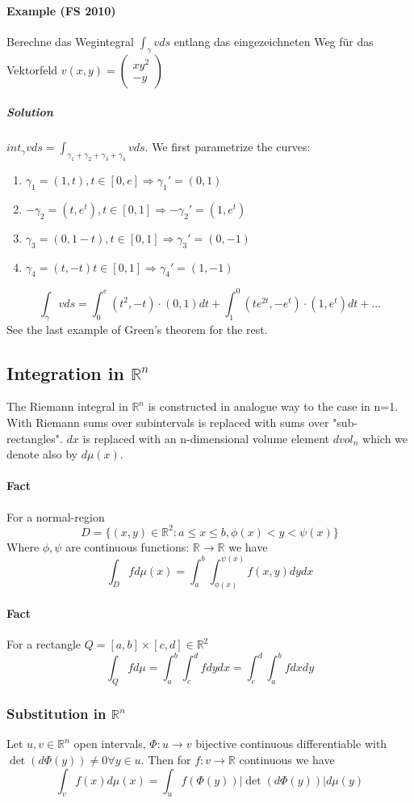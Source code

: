 \documentclass[11pt,a4paper]{book}
\begin{document}
\paragraph*{Example (FS 2010)}
Berechne das Wegintegral $\int_\gamma vds$ entlang das eingezeichneten Weg  für das Vektorfeld $v(x,y)=\begin{pmatrix}
xy^2 \\ 
-y
\end{pmatrix} $
\subparagraph*{Solution}
$int_\gamma vds=\int_{\gamma_1+\gamma_2+\gamma_3+\gamma_4} vds$. We first parametrize the curves:
\begin{enumerate}
\item $\gamma_1=(1,t), t \in [0,e] \Rightarrow \gamma_1 '=(0,1)$
\item $-\gamma_2=(t,e^t), t \in [0,1] \Rightarrow -\gamma_2 '=(1, e^t)$
\item $\gamma_3=(0,1-t), t\in [0,1] \Rightarrow \gamma_3 '=(0,-1)$
\item $\gamma_4=(t,-t) t\in [0,1] \Rightarrow \gamma_4 '=(1,-1)$
\end{enumerate}
$$\int_{\gamma} vds= \int_0^e (t^2, -t)\cdot(0, 1)dt+\int_1^0(te^{2t}, -e^t)\cdot (1, e^t)dt + ...$$
See the last example of Green's theorem for the rest.

\subsection{Integration in $\mathbb{R}^n$}
The Riemann integral in $\mathbb{R}^n$ is constructed in analogue way to the case in n=1. With Riemann sums over subintervals is replaced with sums over "sub-rectangles". $dx$ is replaced with an n-dimensional volume element $dvol_n$ which we denote also by $d\mu(x)$.
\paragraph*{Fact} For a normal-region $$D=\{(x,y) \in \mathbb{R}^2 : a\leq x\leq b, \phi (x)<y< \psi (x)\}$$
Where $\phi, \psi$ are continuous functions: $\mathbb{R} \rightarrow \mathbb{R}$ we have
$$\int_D fd\mu(x)= \int_a^b \int_{\phi(x)}^{\psi(x)} f(x,y) dy dx$$ 
\paragraph*{Fact} For a rectangle $Q=[a,b]\times[c,d] \in \mathbb{R}^2$
$$\int_Q f d\mu =\int_a^b \int_c^d f dy dx = \int_c^d \int_a^b f dx dy$$

\subsubsection{Substitution in $\mathbb{R}^n$}
Let $u,v \in \mathbb{R}^n$ open intervals, $\Phi : u \rightarrow v$ bijective continuous differentiable with $\det(d\Phi (y)) \neq 0 \forall y \in u$. Then for $f: v\rightarrow \mathbb{R}$ continuous we have
$$\int_v f(x) d\mu (x)= \int_u f(\Phi(y)) |\det(d\Phi(y))| d\mu(y)$$   
\end{document}
